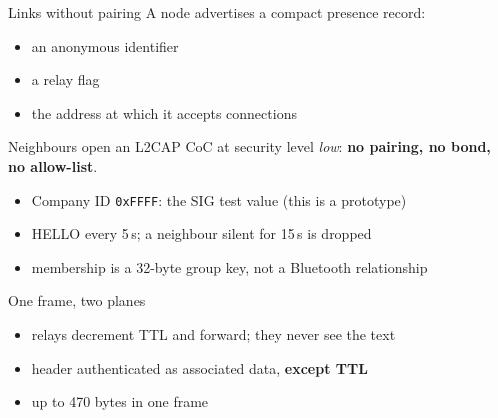 \documentclass[aspectratio=169,11pt]{beamer}
\begin{document}
\begin{frame}{Links without pairing}
A node advertises a compact presence record:
\begin{itemize}
  \item an anonymous identifier
  \item a relay flag
  \item the address at which it accepts connections
\end{itemize}
\vspace{3mm}
Neighbours open an L2CAP CoC at security level \emph{low}:
\textbf{no pairing, no bond, no allow-list}.
\vspace{4mm}
\begin{itemize}
  \item Company ID \texttt{0xFFFF}: the SIG test value (this is a prototype)
  \item HELLO every 5\,s; a neighbour silent for 15\,s is dropped
  \item membership is a 32-byte group key, not a Bluetooth relationship
\end{itemize}
\end{frame}

\begin{frame}{One frame, two planes}
\centering
{}
\vspace{8mm}
\begin{itemize}
  \item relays decrement TTL and forward; they never see the text
  \item header authenticated as associated data, \textbf{except TTL}
  \item up to 470 bytes in one frame
\end{itemize}
\end{frame}
\end{document}
